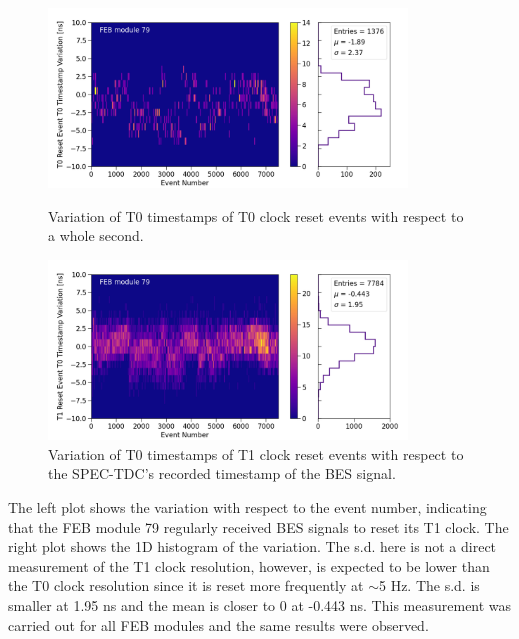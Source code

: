 \begin{figure}[b!] 
\centering    
\includegraphics[width=0.85\textwidth]{upstream_T0stability_combined_board79}
\caption[Variation of T0 Timestamps of T0 Clock Reset Events Against Event Number]{
Variation of T0 timestamps of T0 clock reset events with respect to a whole second.
}
\label{fig:UpstreamT0StabilityCombinedBoard79}
\centering    
\includegraphics[width=0.85\textwidth]{upstream_T1stability_combined_board79}
\caption[Variation of T0 Timestamps of T1 Clock Reset Events Against Event Number]{
Variation of T0 timestamps of T1 clock reset events with respect to the SPEC-TDC's recorded timestamp of the BES signal.
}
\label{fig:UpstreamT1StabilityCombinedBoard79}
\end{figure}


The left plot shows the variation with respect to the event number, indicating that the FEB module 79 regularly received BES signals to reset its T1 clock.
The right plot shows the 1D histogram of the variation.
The s.d. here is not a direct measurement of the T1 clock resolution, however, is expected to be lower than the T0 clock resolution since it is reset more frequently at $\sim$5 Hz.
The s.d. is smaller at 1.95 ns and the mean is closer to 0 at -0.443 ns.
This measurement was carried out for all FEB modules and the same results were observed.

